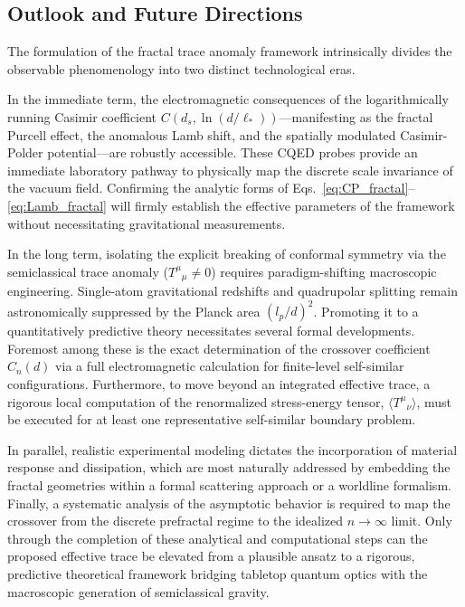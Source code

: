 \documentclass[12pt,letterpaper]{article}
\begin{document}
\subsection{Outlook and Future Directions}

The formulation of the fractal trace anomaly framework intrinsically divides the observable phenomenology into two distinct technological eras. 

In the immediate term, the electromagnetic consequences of the logarithmically running Casimir coefficient $C(d_s,\ln(d/\ell_*))$---manifesting as the fractal Purcell effect, the anomalous Lamb shift, and the spatially modulated Casimir-Polder potential---are robustly accessible. These CQED probes provide an immediate laboratory pathway to physically map the discrete scale invariance of the vacuum field. Confirming the analytic forms of Eqs.~\eqref{eq:CP_fractal}--\eqref{eq:Lamb_fractal} will firmly establish the effective parameters of the framework without necessitating gravitational measurements.

In the long term, isolating the explicit breaking of conformal symmetry via the semiclassical trace anomaly ($T^\mu{}_{\mu} \neq 0$) requires paradigm-shifting macroscopic engineering. Single-atom gravitational redshifts and quadrupolar splitting remain astronomically suppressed by the Planck area $(l_p/d)^2$. Promoting it to a quantitatively predictive theory necessitates several formal developments. Foremost among these is the exact determination of the crossover coefficient $C_n(d)$ via a full electromagnetic calculation for finite-level self-similar configurations. Furthermore, to move beyond an integrated effective trace, a rigorous local computation of the renormalized stress-energy tensor, $\langle T^\mu{}_{\nu}\rangle$, must be executed for at least one representative self-similar boundary problem.

In parallel, realistic experimental modeling dictates the incorporation of material response and dissipation, which are most naturally addressed by embedding the fractal geometries within a formal scattering approach or a worldline formalism. Finally, a systematic analysis of the asymptotic behavior is required to map the crossover from the discrete prefractal regime to the idealized $n\to\infty$ limit. Only through the completion of these analytical and computational steps can the proposed effective trace be elevated from a plausible ansatz to a rigorous, predictive theoretical framework bridging tabletop quantum optics with the macroscopic generation of semiclassical gravity.
\end{document}
